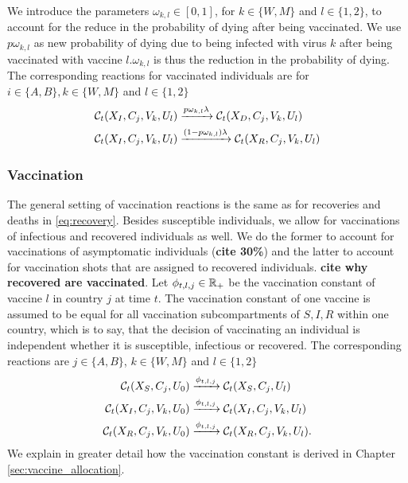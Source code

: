 We introduce the parameters $\omega_{k,l} \in [0,1]$, for $k \in \{W, M\}$ and $l \in \{1,2\}$, to account for the reduce in the probability of dying after being vaccinated. We use $p \omega_{k,l}$ as new probability of dying due to being infected with virus $k$ after being vaccinated with vaccine $l$.$\omega_{k,l}$ is thus the reduction in the probability of dying. The corresponding reactions for vaccinated individuals are for $i \in \{A, B\}, k \in \{W, M\}$ and $l \in \{1,2\}$
\begin{align}
    \mathcal{C}_t(X_I, C_j, V_k, U_l) &\xrightarrow{p \omega_{k,l} \lambda} \mathcal{C}_t(X_D,C_j, V_k, U_l) \\
    \mathcal{C}_t(X_I, C_j, V_k, U_l) &\xrightarrow{(1-p \omega_{k,l}) \lambda} \mathcal{C}_t(X_R,C_j, V_k, U_l) \notag
\end{align}

\subsubsection{Vaccination}
The general setting of vaccination reactions is the same as for recoveries and deaths in \eqref{eq:recovery}. Besides susceptible individuals, we allow for vaccinations of infectious and recovered individuals as well. We do the former to account for vaccinations of asymptomatic individuals (\textbf{cite 30\%}) and the latter to account for vaccination shots that are assigned to recovered individuals. \textbf{cite why recovered are vaccinated}. Let $\phi_{t, l,j} \in \mathbb{R}_+$ be the vaccination constant of vaccine $l$ in country $j$ at time $t$. The vaccination constant of one vaccine is assumed to be equal for all vaccination subcompartments of $S, I,R$ within one country, which is to say, that the decision of vaccinating an individual is independent whether it is susceptible, infectious or recovered.  The corresponding reactions are $j \in \{A,B\}$, $k \in \{W,M\}$ and $l \in \{1,2\}$
\begin{align}
\mathcal{C}_t(X_S, C_j, U_0) &\xrightarrow{\phi_{t,l, j}} \mathcal{C}_t(X_S, C_j, U_l)  \\
\mathcal{C}_t(X_I, C_j, V_k, U_0) &\xrightarrow{\phi_{t,l,j}} \mathcal{C}_t(X_I, C_j, V_k, U_l) \notag \\
\mathcal{C}_t(X_R, C_j, V_k, U_0) &\xrightarrow{\phi_{t,l,j}} \mathcal{C}_t(X_R, C_j, V_k, U_l). \notag
\end{align}
We explain in greater detail how the vaccination constant is derived in Chapter \ref{sec:vaccine_allocation}.


